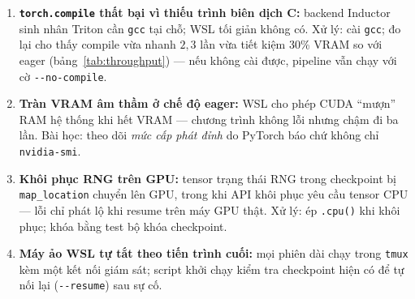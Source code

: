 \begin{enumerate}
	\item \textbf{\texttt{torch.compile} thất bại vì thiếu trình biên dịch C:}
	      backend Inductor sinh nhân Triton cần \texttt{gcc} tại chỗ; WSL tối
	      giản không có. Xử lý: cài \texttt{gcc}; đo lại cho thấy compile vừa
	      nhanh $2{,}3$ lần vừa tiết kiệm 30\% VRAM so với eager
	      (bảng~\ref{tab:throughput}) --- nếu không cài được, pipeline vẫn chạy
	      với cờ \texttt{-{}-no-compile}.
	\item \textbf{Tràn VRAM âm thầm ở chế độ eager:} WSL cho phép CUDA ``mượn''
	      RAM hệ thống khi hết VRAM --- chương trình không lỗi nhưng chậm đi ba
	      lần. Bài học: theo dõi \emph{mức cấp phát đỉnh} do PyTorch báo chứ
	      không chỉ \texttt{nvidia-smi}.
	\item \textbf{Khôi phục RNG trên GPU:} tensor trạng thái RNG trong
	      checkpoint bị \texttt{map\_location} chuyển lên GPU, trong khi API
	      khôi phục yêu cầu tensor CPU --- lỗi chỉ phát lộ khi resume trên máy
	      GPU thật. Xử lý: ép \texttt{.cpu()} khi khôi phục; khóa bằng test bộ
	      khóa checkpoint.
	\item \textbf{Máy ảo WSL tự tắt theo tiến trình cuối:} mọi phiên dài chạy
	      trong \texttt{tmux} kèm một kết nối giám sát; script khởi chạy kiểm
	      tra checkpoint hiện có để tự nối lại (\texttt{-{}-resume}) sau sự cố.
\end{enumerate}
